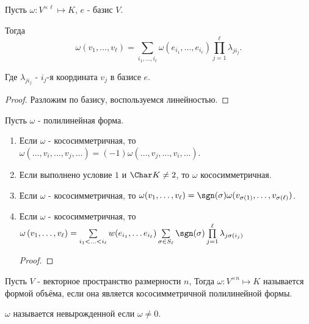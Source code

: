 \begin{statement} \thmslashn

    Пусть $\omega : V^{\times \ell} \mapsto K$, $e$ - базис $V$.

    Тогда 
    \[ \omega(v_1, \ldots, v_{\ell}) = \sum\limits_{i_1, \ldots, i_{\ell}} \omega(e_{i_1}, \ldots, e_{i_{\ell}}) \prod\limits_{j=1}^{\ell} \lambda_{ji_{j}}   .\]
    
    Где $\lambda_{ji_{j}}$ - $i_{j}$-я координата $v_{j}$ в базисе $e$.
    \begin{proof} \thmslashn

        Разложим по базису, воспользуемся линейностью.
    \end{proof}
\end{statement}
\begin{statement} \thmslashn

    Пусть $\omega$ - полилинейная форма.
    \begin{enumerate}
        \item Если $\omega$ - кососимметричная, то $\omega(\ldots, v_{i}, \ldots, v_{j}, \ldots) = (-1) \omega(\ldots, v_{j}, \ldots, v_{i}, \ldots)$.
        \item Если выполнено условие $1$ и  $\Char K \neq 2$, то $\omega$ кососимметричная.  
        \item Если $\omega$ - кососимметричная, то $\omega(v_1, \ldots, v_{\ell}) = \sgn(\sigma)\omega(v_{\sigma(1)}, \ldots, v_{\sigma(\ell)})$.
        \item Если $\omega$ - кососимметричная, то $\omega\left( v_1, \ldots, v_{\ell} \right) = \sum\limits_{i_1 < \ldots < i_{\ell}} w(e_{i_1}, \ldots e_{i_{\ell}}) \sum\limits_{\sigma\in S_{\ell}} \sgn(\sigma)\prod\limits_{j=1}^{\ell} \lambda_{j\sigma(i_{j})}  $
        \begin{proof} \thmslashn
        
            \TODO{}
        \end{proof}
    \end{enumerate}
\end{statement}
\begin{definition} \thmslashn 

    Пусть $V$ - векторное пространство размерности $n$, Тогда $\omega : V^{\times n} \mapsto K$ называется формой объёма, если она является кососимметричной полилинейной формы.
\end{definition}
\begin{remark} \thmslashn

    $\omega$ называется невырожденной если $\omega \neq 0$.
\end{remark}

